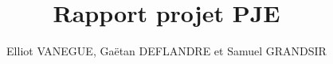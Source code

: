 \documentclass[a4paper,11pt]{article}
\title{Rapport projet PJE}
\author{Elliot VANEGUE, Gaëtan DEFLANDRE et Samuel GRANDSIR}
\begin{document}
\maketitle

\newpage
\renewcommand{\contentsname}{Sommaire}
\tableofcontents
\newpage
\listoffigures



\newpage


\newpage


\newpage


\newpage


\newpage


\newpage


\newpage


\newpage

\end{document}
